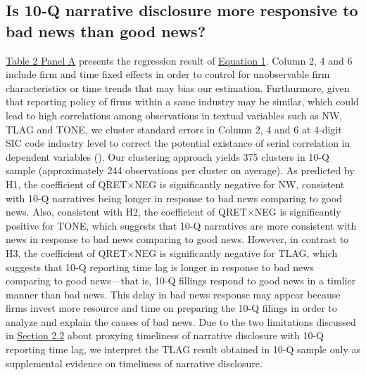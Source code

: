 \documentclass[a4paper]{article}
\begin{document}
\begin{spacing}{2}
\subsection{Is 10-Q narrative disclosure more responsive to bad news than good news?}
\hyperref[T2PA]{Table 2 Panel A} presents the regression result of \hyperref[eq1]{Equation 1}. Column 2, 4 and 6 include firm and time fixed effects in order to control for unobservable firm characteristics or time trends that may bias our estimation. Furthurmore, given that reporting policy of firms within a same industry may be similar, which could lead to high correlations among observations in textual variables such as NW, TLAG and TONE, we cluster standard errors in Column 2, 4 and 6 at 4-digit SIC code industry level to correct the potential existance of serial correlation in dependent variables (\cite{petersenEstimatingStandardErrors2009}). Our clustering approach yields 375 clusters in 10-Q sample (approximately 244 observations per cluster on average). As predicted by H1, the coefficient of QRET$\times$NEG is significantly negative for NW, consistent with 10-Q narratives being longer in response to bad news comparing to good news. Also, consistent with H2, the coefficient of QRET$\times$NEG is significantly positive for TONE, which suggests that 10-Q narratives are more consistent with news in response to bad news comparing to good news. However, in contrast to H3, the coefficient of QRET$\times$NEG is significantly negative for TLAG, which suggests that 10-Q reporting time lag is longer in response to bad news comparing to good news---that is, 10-Q fillings respond to good news in a timlier manner than bad news. This delay in bad news response may appear because firms invest more resource and time on preparing the 10-Q filings in order to analyze and explain the causes of bad news. Due to the two limitations discussed in \hyperref[sec2.2]{Section 2.2} about proxying timeliness of narrative disclosure with 10-Q reporting time lag, we interpret the TLAG result obtained in 10-Q sample only as supplemental evidence on timeliness of narrative disclosure.


\end{spacing}
\end{document}
